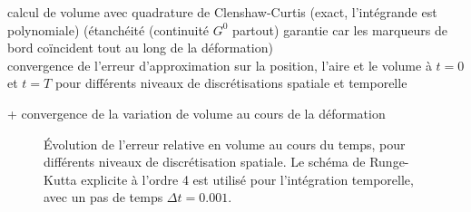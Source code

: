 calcul de volume avec quadrature de Clenshaw-Curtis (exact, l'intégrande est polynomiale) (étanchéité (continuité $G^0$ partout) garantie car les marqueurs de bord coïncident tout au long de la déformation)\\
convergence de l'erreur d'approximation sur la position, l'aire et le volume à $t = 0$ et $t = T$ pour différents niveaux de discrétisations spatiale et temporelle\\

\def\axw{0.48\textwidth}
\def\axh{0.39\textwidth}
\def\xlabl{dof}
\def\ylabl{Erreur}
\def\xsep{2pt}


+ convergence de la variation de volume au cours de la déformation\\
\begin{figure}
  \centering
  \caption{Évolution de l'erreur relative en volume au cours du temps, pour différents niveaux de discrétisation spatiale. Le schéma de Runge-Kutta explicite à l'ordre 4 est utilisé pour l'intégration temporelle, avec un pas de temps $\Delta t = 0.001$.}
\end{figure}

